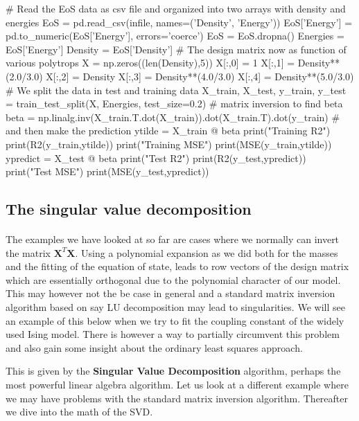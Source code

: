 \documentclass[%
oneside,                 %
final,                   %
10pt]{article}
\begin{document}
# Read the EoS data as  csv file and organized into two arrays with density and energies
EoS = pd.read_csv(infile, names=('Density', 'Energy'))
EoS['Energy'] = pd.to_numeric(EoS['Energy'], errors='coerce')
EoS = EoS.dropna()
Energies = EoS['Energy']
Density = EoS['Density']
#  The design matrix now as function of various polytrops
X = np.zeros((len(Density),5))
X[:,0] = 1
X[:,1] = Density**(2.0/3.0)
X[:,2] = Density
X[:,3] = Density**(4.0/3.0)
X[:,4] = Density**(5.0/3.0)
# We split the data in test and training data
X_train, X_test, y_train, y_test = train_test_split(X, Energies, test_size=0.2)
# matrix inversion to find beta
beta = np.linalg.inv(X_train.T.dot(X_train)).dot(X_train.T).dot(y_train)
# and then make the prediction
ytilde = X_train @ beta
print("Training R2")
print(R2(y_train,ytilde))
print("Training MSE")
print(MSE(y_train,ytilde))
ypredict = X_test @ beta
print("Test R2")
print(R2(y_test,ypredict))
print("Test MSE")
print(MSE(y_test,ypredict))
\epycod


\subsection{The singular value decomposition}


\paragraph{}

The examples we have looked at so far are cases where we normally can
invert the matrix $\bm{X}^T\bm{X}$. Using a polynomial expansion as we
did both for the masses and the fitting of the equation of state,
leads to row vectors of the design matrix which are essentially
orthogonal due to the polynomial character of our model. This may
however not the be case in general and a standard matrix inversion
algorithm based on say LU decomposition may lead to singularities. We will see an example of this below when we try to fit
the coupling constant of the widely used Ising model. 
There is however a way to partially circumvent this problem and also gain some insight about the ordinary least squares approach. 

This is given by the \textbf{Singular Value Decomposition} algorithm, perhaps
the most powerful linear algebra algorithm.  Let us look at a
different example where we may have problems with the standard matrix
inversion algorithm. Thereafter we dive into the math of the SVD.
\end{document}
